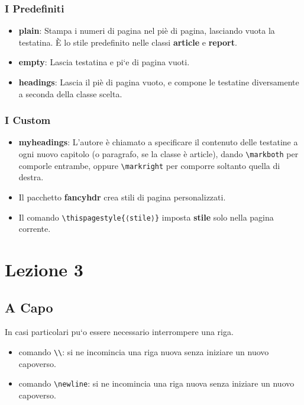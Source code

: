 \documentclass{report}
\begin{document}
            \subsection{I Predefiniti}
                \begin{itemize}
                    \item \textbf{plain}: Stampa i numeri di pagina nel piè di pagina, lasciando vuota la testatina. È lo stile predefinito nelle classi \textbf{article} e \textbf{report}.
                    \item \textbf{empty}: Lascia testatina e pi`e di pagina vuoti.
                    \item \textbf{headings}: Lascia il piè di pagina vuoto, e compone le testatine diversamente a seconda della classe scelta.
                \end{itemize}

            \subsection{I Custom}
                \begin{itemize}
                    \item \textbf{myheadings}: L'autore è chiamato a specificare il contenuto delle testatine a ogni nuovo capitolo (o paragrafo, se la classe è article), dando \verb!\markboth! per comporle entrambe, oppure \verb!\markright! per comporre soltanto quella di destra.
                    \item Il pacchetto \textbf{fancyhdr} crea stili di pagina personalizzati.
                    \item Il comando \verb!\thispagestyle{⟨stile⟩}! imposta \textbf{stile} solo nella pagina corrente.
                \end{itemize}


    \chapter{Lezione 3}

        \section{A Capo}
            In casi particolari pu`o essere necessario interrompere una riga.

            \begin{itemize}
                \item comando \verb!\\!: si ne incomincia una riga nuova senza iniziare un nuovo capoverso.
                \item comando \verb!\newline!: si ne incomincia una riga nuova senza iniziare un nuovo capoverso.
            \end{itemize}
\end{document}
